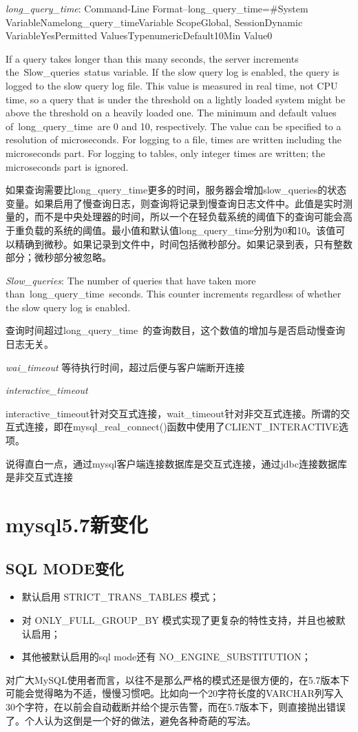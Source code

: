 \textit{long_query_time}:
Command-Line Format--long_query_time=\#System VariableNamelong_query_timeVariable ScopeGlobal, SessionDynamic VariableYesPermitted ValuesTypenumericDefault10Min Value0

If a query takes longer than this many seconds, the server increments the Slow_queries status variable. If the slow query log is enabled, the query is logged to the slow query log file. This value is measured in real time, not CPU time, so a query that is under the threshold on a lightly loaded system might be above the threshold on a heavily loaded one. The minimum and default values of long_query_time are 0 and 10, respectively. The value can be specified to a resolution of microseconds. For logging to a file, times are written including the microseconds part. For logging to tables, only integer times are written; the microseconds part is ignored. 

如果查询需要比long_query_time更多的时间，服务器会增加slow_queries的状态变量。如果启用了慢查询日志，则查询将记录到慢查询日志文件中。此值是实时测量的，而不是中央处理器的时间，所以一个在轻负载系统的阈值下的查询可能会高于重负载的系统的阈值。最小值和默认值long_query_time分别为0和10。该值可以精确到微秒。如果记录到文件中，时间包括微秒部分。如果记录到表，只有整数部分；微秒部分被忽略。

\textit{Slow_queries}:
The number of queries that have taken more than long_query_time seconds. This counter increments regardless of whether the slow query log is enabled.

查询时间超过long_query_time 的查询数目，这个数值的增加与是否启动慢查询日志无关。

\textit{wai_timeout}
等待执行时间，超过后便与客户端断开连接

\textit{interactive_timeout}

interactive_timeout针对交互式连接，wait_timeout针对非交互式连接。所谓的交互式连接，即在mysql_real_connect()函数中使用了CLIENT_INTERACTIVE选项。

   说得直白一点，通过mysql客户端连接数据库是交互式连接，通过jdbc连接数据库是非交互式连接
     
\section{mysql5.7新变化}

\subsection{SQL MODE变化}
\begin{itemize}
\item 默认启用 STRICT_TRANS_TABLES 模式；
\item 对 ONLY_FULL_GROUP_BY 模式实现了更复杂的特性支持，并且也被默认启用；
\item 其他被默认启用的sql mode还有 NO_ENGINE_SUBSTITUTION；
\end{itemize}
对广大MySQL使用者而言，以往不是那么严格的模式还是很方便的，在5.7版本下可能会觉得略为不适，慢慢习惯吧。比如向一个20字符长度的VARCHAR列写入30个字符，在以前会自动截断并给个提示告警，而在5.7版本下，则直接抛出错误了。个人认为这倒是一个好的做法，避免各种奇葩的写法。

